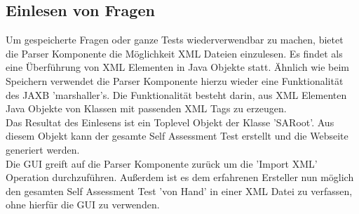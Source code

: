\subsection{Einlesen von Fragen}
Um gespeicherte Fragen oder ganze Tests wiederverwendbar zu machen, bietet die Parser Komponente die Möglichkeit XML Dateien einzulesen. Es findet als eine Überführung von XML Elementen in Java Objekte statt. Ähnlich wie beim Speichern verwendet die Parser Komponente hierzu wieder eine Funktionalität des JAXB\cite{JAXB} 'marshaller's. Die Funktionalität besteht darin, aus XML Elementen Java Objekte von Klassen mit passenden XML Tags zu erzeugen.\\
Das Resultat des Einlesens ist ein Toplevel Objekt der Klasse 'SARoot'. Aus diesem Objekt kann der gesamte Self Assessment Test erstellt und die Webseite generiert werden. \\
Die GUI greift auf die Parser Komponente zurück um die 'Import XML' Operation durchzuführen. Außerdem ist es dem erfahrenen Ersteller nun möglich den gesamten Self Assessment Test 'von Hand' in einer XML Datei zu verfassen, ohne hierfür die GUI zu verwenden. 



